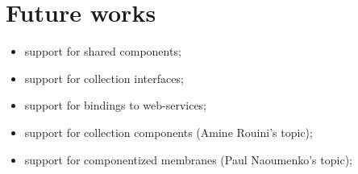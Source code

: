 \documentclass{article}
\begin{document}
\section{Future works}
\begin{itemize}
  \item support for shared components;
  \item support for collection interfaces;
  \item support for bindings to web-services;
  \item support for collection components (Amine Rouini's topic);
  \item support for componentized membranes (Paul Naoumenko's topic);
\end{itemize}
\end{document}
